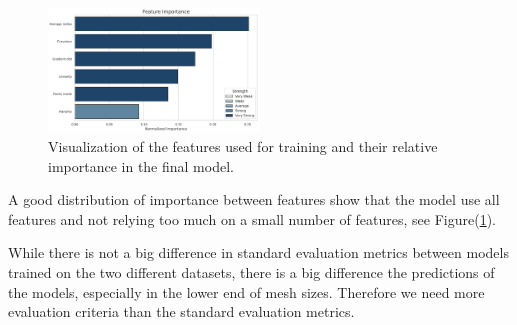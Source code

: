 \begin{figure}[htbp]
\centering
\includegraphics[width=0.5\textwidth]{figures/feature_importance_lowQ.png}
\caption{Visualization of the features used for training and their relative importance in the final model.}
\label{fig:feature_importance}
\end{figure}

A good distribution of importance between features show that the model use all features and not relying too much on a small number of features, see Figure(\ref{fig:feature_importance}).

While there is not a big difference in standard evaluation metrics between models trained on the two different datasets, there is a big difference the predictions of the models, especially in the lower end of mesh sizes. Therefore we need more evaluation criteria than the standard evaluation metrics.

